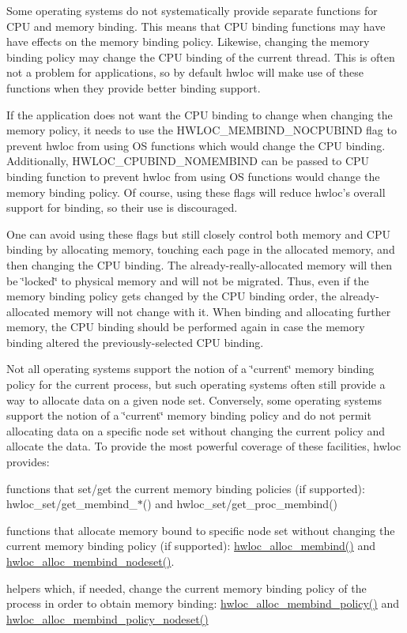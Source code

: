 Some operating systems do not systematically provide separate functions for CPU and memory binding. This means that CPU binding functions may have have effects on the memory binding policy. Likewise, changing the memory binding policy may change the CPU binding of the current thread. This is often not a problem for applications, so by default hwloc will make use of these functions when they provide better binding support.

If the application does not want the CPU binding to change when changing the memory policy, it needs to use the HWLOC\_\-MEMBIND\_\-NOCPUBIND flag to prevent hwloc from using OS functions which would change the CPU binding. Additionally, HWLOC\_\-CPUBIND\_\-NOMEMBIND can be passed to CPU binding function to prevent hwloc from using OS functions would change the memory binding policy. Of course, using these flags will reduce hwloc's overall support for binding, so their use is discouraged.

One can avoid using these flags but still closely control both memory and CPU binding by allocating memory, touching each page in the allocated memory, and then changing the CPU binding. The already-\/really-\/allocated memory will then be \char`\"{}locked\char`\"{} to physical memory and will not be migrated. Thus, even if the memory binding policy gets changed by the CPU binding order, the already-\/allocated memory will not change with it. When binding and allocating further memory, the CPU binding should be performed again in case the memory binding altered the previously-\/selected CPU binding.

Not all operating systems support the notion of a \char`\"{}current\char`\"{} memory binding policy for the current process, but such operating systems often still provide a way to allocate data on a given node set. Conversely, some operating systems support the notion of a \char`\"{}current\char`\"{} memory binding policy and do not permit allocating data on a specific node set without changing the current policy and allocate the data. To provide the most powerful coverage of these facilities, hwloc provides:


\begin{DoxyItemize}
\item functions that set/get the current memory binding policies (if supported): hwloc\_\-set/get\_\-membind\_\-$\ast$() and hwloc\_\-set/get\_\-proc\_\-membind() 
\item functions that allocate memory bound to specific node set without changing the current memory binding policy (if supported): \hyperlink{a00050_ga221a7edc5d436300374fa16463f607e5}{hwloc\_\-alloc\_\-membind()} and \hyperlink{a00050_gaeaa00714a9c4319bda0a74ca6f8720e8}{hwloc\_\-alloc\_\-membind\_\-nodeset()}. 
\item helpers which, if needed, change the current memory binding policy of the process in order to obtain memory binding: \hyperlink{a00059_ga6178c6a9ec1dd88ec9f6a9fcdcc7d634}{hwloc\_\-alloc\_\-membind\_\-policy()} and \hyperlink{a00059_ga3e772fbc4de626ed80f13d332b7d4d03}{hwloc\_\-alloc\_\-membind\_\-policy\_\-nodeset()} 
\end{DoxyItemize}

